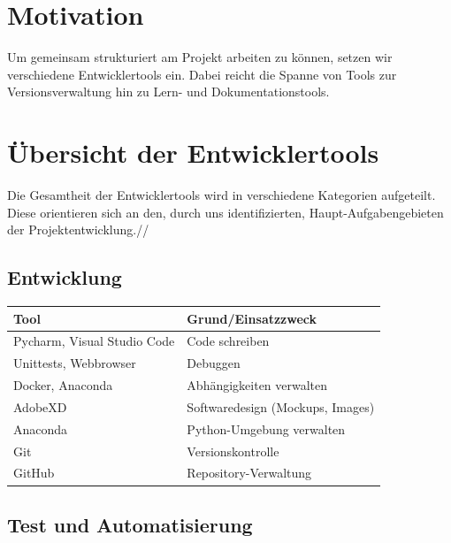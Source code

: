 \documentclass[a4paper,11pt]{scrartcl}
\begin{document}


\section{Motivation}

Um gemeinsam strukturiert am Projekt arbeiten zu können, setzen wir verschiedene Entwicklertools ein.
Dabei reicht die Spanne von Tools zur Versionsverwaltung hin zu Lern- und Dokumentationstools.

\section{Übersicht der Entwicklertools}

Die Gesamtheit der Entwicklertools wird in verschiedene Kategorien aufgeteilt.
Diese orientieren sich an den, durch uns identifizierten, Haupt-Aufgabengebieten der Projektentwicklung.//

\subsection{Entwicklung}

\begin{table}[H]
\begin{center}
\begin{tabular}{|p{4cm}|p{8cm}|}
\hline
\textbf{Tool} &\textbf{Grund/Einsatzzweck} \\ \hline
Pycharm, Visual Studio Code & Code schreiben \\ \hline
Unittests, Webbrowser & Debuggen\\ \hline
Docker, Anaconda & Abhängigkeiten verwalten\\ \hline
AdobeXD & Softwaredesign (Mockups, Images)\\ \hline
Anaconda & Python-Umgebung verwalten\\ \hline
Git & Versionskontrolle\\ \hline
GitHub & Repository-Verwaltung\\ \hline    
\end{tabular}
\end{center}
\end{table}

\subsection{Test und Automatisierung}
\end{document}

